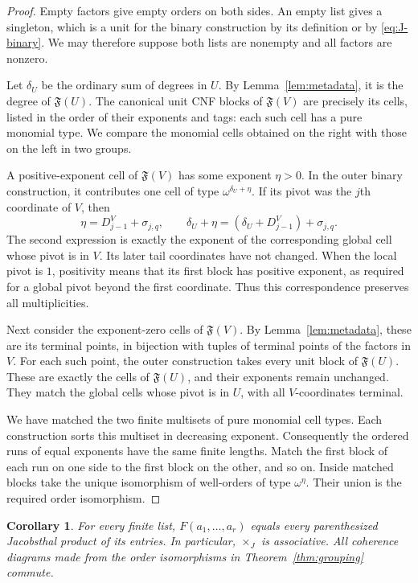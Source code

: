 \documentclass[11pt,letterpaper]{article}
\newtheorem{corollary}[theorem]{Corollary}
\theoremstyle{definition}
\theoremstyle{remark}
\newcommand{\J}{\mathbin{\times_{\!J}}}
\newcommand{\FF}{\mathfrak F}
\begin{document}
\begin{proof}
Empty factors give empty orders on both sides. An empty list gives a
singleton, which is a unit for the binary construction by its definition
or by \eqref{eq:J-binary}. We may therefore suppose both lists are
nonempty and all factors are nonzero.

Let $\delta_U$ be the ordinary sum of degrees in $U$. By
Lemma~\ref{lem:metadata}, it is the degree of $\FF(U)$. The canonical
unit CNF blocks of $\FF(V)$ are precisely its cells, listed in the order
of their exponents and tags: each such cell has a pure monomial type.
We compare the monomial cells obtained on the right with those on the
left in two groups.

A positive-exponent cell of $\FF(V)$ has some exponent $\eta>0$. In the
outer binary construction, it contributes one cell of type
$\omega^{\delta_U+\eta}$. If its pivot was the $j$th coordinate of $V$,
then
\[
 \eta=D^{V}_{j-1}+\sigma_{j,q},
 \qquad
 \delta_U+\eta=(\delta_U+D^{V}_{j-1})+\sigma_{j,q}.
\]
The second expression is exactly the exponent of the corresponding global
cell whose pivot is in $V$. Its later tail coordinates have not changed.
When the local pivot is $1$, positivity means that its first block has
positive exponent, as required for a global pivot beyond the first
coordinate. Thus this correspondence preserves all multiplicities.

Next consider the exponent-zero cells of $\FF(V)$. By
Lemma~\ref{lem:metadata}, these are its terminal points, in bijection with
tuples of terminal points of the factors in $V$. For each such point, the
outer construction takes every unit block of $\FF(U)$. These are exactly
the cells of $\FF(U)$, and their exponents remain unchanged. They match
the global cells whose pivot is in $U$, with all $V$-coordinates terminal.

We have matched the two finite multisets of pure monomial cell types.
Each construction sorts this multiset in decreasing exponent. Consequently
the ordered runs of equal exponents have the same finite lengths.
Match the first block of each run on one side to the first block on the
other, and so on. Inside matched blocks take the unique isomorphism of
well-orders of type $\omega^\eta$. Their union is the required order
isomorphism.
\end{proof}

\begin{corollary}\label{cor:finite-assoc}
For every finite list, $F(a_1,\ldots,a_r)$ equals every parenthesized
Jacobsthal product of its entries. In particular, $\J$ is associative.
All coherence diagrams made from the order isomorphisms in
Theorem~\ref{thm:grouping} commute.
\end{corollary}
\end{document}
